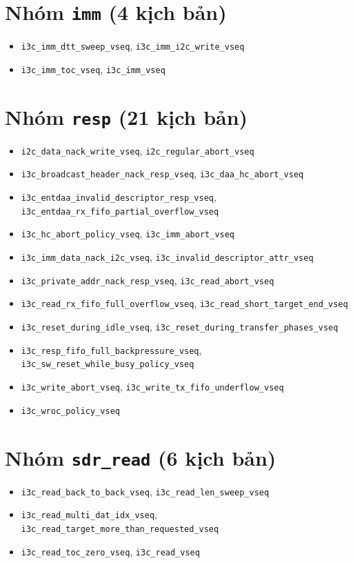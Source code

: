 \section*{Nhóm \texttt{imm} (4 kịch bản)}
\begin{itemize}\itemsep0pt
  \item \texttt{i3c\_imm\_dtt\_sweep\_vseq}, \texttt{i3c\_imm\_i2c\_write\_vseq}
  \item \texttt{i3c\_imm\_toc\_vseq}, \texttt{i3c\_imm\_vseq}
\end{itemize}

\section*{Nhóm \texttt{resp} (21 kịch bản)}
\begin{itemize}\itemsep0pt
  \item \texttt{i2c\_data\_nack\_write\_vseq}, \texttt{i2c\_regular\_abort\_vseq}
  \item \texttt{i3c\_broadcast\_header\_nack\_resp\_vseq}, \texttt{i3c\_daa\_hc\_abort\_vseq}
  \item \texttt{i3c\_entdaa\_invalid\_descriptor\_resp\_vseq}, \texttt{i3c\_entdaa\_rx\_fifo\_partial\_overflow\_vseq}
  \item \texttt{i3c\_hc\_abort\_policy\_vseq}, \texttt{i3c\_imm\_abort\_vseq}
  \item \texttt{i3c\_imm\_data\_nack\_i2c\_vseq}, \texttt{i3c\_invalid\_descriptor\_attr\_vseq}
  \item \texttt{i3c\_private\_addr\_nack\_resp\_vseq}, \texttt{i3c\_read\_abort\_vseq}
  \item \texttt{i3c\_read\_rx\_fifo\_full\_overflow\_vseq}, \texttt{i3c\_read\_short\_target\_end\_vseq}
  \item \texttt{i3c\_reset\_during\_idle\_vseq}, \texttt{i3c\_reset\_during\_transfer\_phases\_vseq}
  \item \texttt{i3c\_resp\_fifo\_full\_backpressure\_vseq}, \texttt{i3c\_sw\_reset\_while\_busy\_policy\_vseq}
  \item \texttt{i3c\_write\_abort\_vseq}, \texttt{i3c\_write\_tx\_fifo\_underflow\_vseq}
  \item \texttt{i3c\_wroc\_policy\_vseq}
\end{itemize}

\section*{Nhóm \texttt{sdr\_read} (6 kịch bản)}
\begin{itemize}\itemsep0pt
  \item \texttt{i3c\_read\_back\_to\_back\_vseq}, \texttt{i3c\_read\_len\_sweep\_vseq}
  \item \texttt{i3c\_read\_multi\_dat\_idx\_vseq}, \texttt{i3c\_read\_target\_more\_than\_requested\_vseq}
  \item \texttt{i3c\_read\_toc\_zero\_vseq}, \texttt{i3c\_read\_vseq}
\end{itemize}

